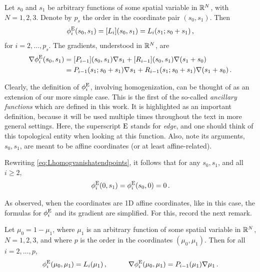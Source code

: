 \begin{definition*}
Let $s_0$ and $s_1$ be arbitrary functions of some spatial variable in $\mathbb{R}^N$, with $N=1,2,3$. Denote by $p_s$ the order in the coordinate pair $(s_0,s_1)$. Then
\begin{equation}
    \phi^{\mathrm{E}}_i(s_0,s_1) = [L_i] (s_0,s_1) = L_i(s_1;s_0+s_1)\,,
\end{equation}
for $i=2,\ldots,p_s$. The gradients, understood in $\mathbb{R}^N$, are
\begin{equation}
    \begin{aligned}
    \nabla\phi^{\mathrm{E}}_i(s_0,s_1)&=[P_{i-1}](s_0,s_1)\nabla s_1 + [R_{i-1}](s_0,s_1)\nabla (s_1+s_0)\\
        &=P_{i-1}(s_1;s_0+s_1)\nabla s_1 + R_{i-1}(s_1;s_0+s_1)\nabla (s_1+s_0)\,.
    \end{aligned}
\end{equation}
\end{definition*}

Clearly, the definition of $\phi_i^{\mathrm{E}}$, involving homogenization, can be thought of as an extension of our more simple case.
This is the first of the so-called \textit{ancillary functions} which are defined in this work.
It is highlighted as an important definition, because it will be used multiple times throughout the text in more general settings.
Here, the superscript $\mathrm{E}$ stands for \textit{edge}, and one should think of this topological entity when looking at this function.
Also, note its arguments, $s_0,s_1$, are meant to be affine coordinates (or at least affine-related).

Rewriting \eqref{eq:Lhomogvanishatendpoints}, it follows that for any $s_0,s_1$, and all $i\geq2$,
\begin{equation}
	\phi^{\mathrm{E}}_i(0,s_1)=\phi^{\mathrm{E}}_i(s_0,0)=0\,.\label{eq:phiEvanishing}
\end{equation}

As observed, when the coordinates are 1D affine coordinates, like in this case, the formulas for $\phi^{\mathrm{E}}_i$ and its gradient are simplified.
For this, record the next remark.

\begin{remark}
Let $\mu_0=1-\mu_1$, where $\mu_1$ is an arbitrary function of some spatial variable in $\mathbb{R}^N$, $N=1,2,3$, and where $p$ is the order in the coordinates $(\mu_0,\mu_1)$. Then for all $i=2,\ldots,p$,
\begin{equation}
    \phi_i^{\mathrm{E}}(\mu_0,\mu_1)=L_i(\mu_1)\,,\quad\qquad \nabla\phi_i^{\mathrm{E}}(\mu_0,\mu_1)=P_{i-1}(\mu_1)\nabla\mu_1\,.
    \label{eq:H11Dspecialcase}
\end{equation}
\end{remark}

